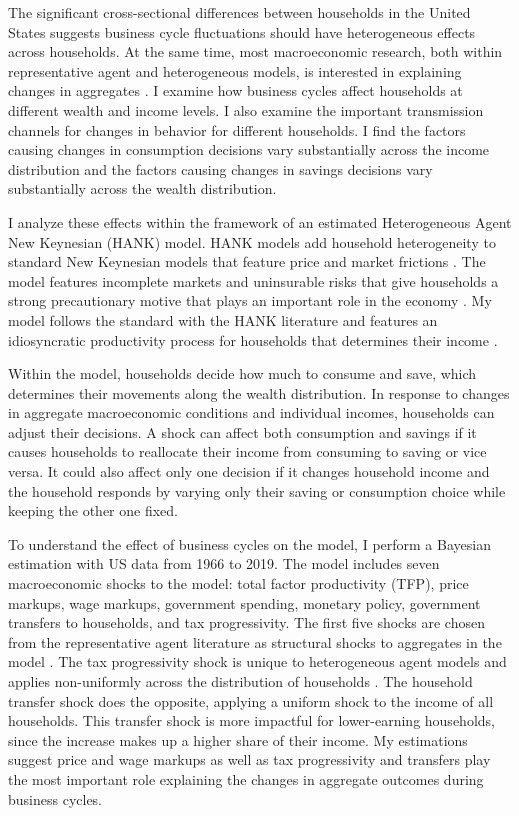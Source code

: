 The significant cross-sectional differences between households in the United States suggests business cycle fluctuations should have heterogeneous effects across households. At the same time, most macroeconomic research, both within representative agent and heterogeneous models, is interested in explaining changes in aggregates \autocites{smets2007shocks}{krusell1998income}{kaplan2018monetary}{auclert2019monetary}{mckay2016power}. I examine how business cycles affect households at different wealth and income levels. I also examine the important transmission channels for changes in behavior for different households. I find the factors causing changes in consumption decisions vary substantially across the income distribution and the factors causing changes in savings decisions vary substantially across the wealth distribution.

I analyze these effects within the framework of an estimated Heterogeneous Agent New Keynesian (HANK) model. HANK models add household heterogeneity to standard New Keynesian models that feature price and market frictions \autocite{kaplan2018monetary}. The model features incomplete markets and uninsurable risks that give households a strong precautionary motive that plays an important role in the economy \autocites{mckay2016power}{bayer2019precautionary}. My model follows the standard with the HANK literature and features an idiosyncratic productivity process for households that determines their income \autocites{kaplan2018monetary}{mckay2016power}.

Within the model, households decide how much to consume and save, which determines their movements along the wealth distribution. In response to changes in aggregate macroeconomic conditions and individual incomes, households can adjust their decisions. A shock can affect both consumption and savings if it causes households to reallocate their income from consuming to saving or vice versa. It could also affect only one decision if it changes household income and the household responds by varying only their saving or consumption choice while keeping the other one fixed.

To understand the effect of business cycles on the model, I perform a Bayesian estimation with US data from 1966 to 2019. The model includes seven macroeconomic shocks to the model: total factor productivity (TFP), price markups, wage markups, government spending, monetary policy, government transfers to households, and tax progressivity. The first five shocks are chosen from the representative agent literature as structural shocks to aggregates in the model \autocite{smets2007shocks}. The tax progressivity shock is unique to heterogeneous agent models and applies non-uniformly across the distribution of households \autocite{bayer2024shocks}. The household transfer shock does the opposite, applying a uniform shock to the income of all households. This transfer shock is more impactful for lower-earning households, since the increase makes up a higher share of their income. My estimations suggest price and wage markups  as well as tax progressivity and transfers play the most important role explaining the changes in aggregate outcomes during business cycles.

